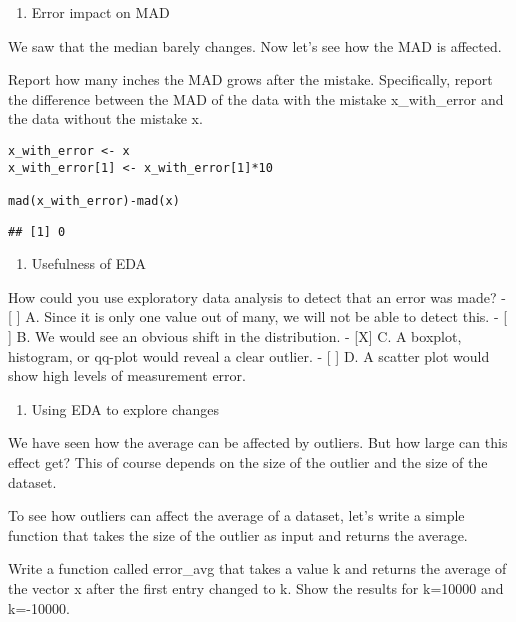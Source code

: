 \documentclass[]{article}
\providecommand{\tightlist}{%
  \setlength{\itemsep}{0pt}\setlength{\parskip}{0pt}}
\begin{document}
\begin{enumerate}
\def\labelenumi{\arabic{enumi}.}
\setcounter{enumi}{5}
\tightlist
\item
  Error impact on MAD
\end{enumerate}

We saw that the median barely changes. Now let's see how the MAD is
affected.

Report how many inches the MAD grows after the mistake. Specifically,
report the difference between the MAD of the data with the mistake
x\_with\_error and the data without the mistake x.

\begin{verbatim}
x_with_error <- x
x_with_error[1] <- x_with_error[1]*10

mad(x_with_error)-mad(x)
\end{verbatim}

\begin{verbatim}
## [1] 0
\end{verbatim}

\begin{enumerate}
\def\labelenumi{\arabic{enumi}.}
\setcounter{enumi}{6}
\tightlist
\item
  Usefulness of EDA
\end{enumerate}

How could you use exploratory data analysis to detect that an error was
made? - {[} {]} A. Since it is only one value out of many, we will not
be able to detect this. - {[} {]} B. We would see an obvious shift in
the distribution. - {[}X{]} C. A boxplot, histogram, or qq-plot would
reveal a clear outlier. - {[} {]} D. A scatter plot would show high
levels of measurement error.

\begin{enumerate}
\def\labelenumi{\arabic{enumi}.}
\setcounter{enumi}{7}
\tightlist
\item
  Using EDA to explore changes
\end{enumerate}

We have seen how the average can be affected by outliers. But how large
can this effect get? This of course depends on the size of the outlier
and the size of the dataset.

To see how outliers can affect the average of a dataset, let's write a
simple function that takes the size of the outlier as input and returns
the average.

Write a function called error\_avg that takes a value k and returns the
average of the vector x after the first entry changed to k. Show the
results for k=10000 and k=-10000.
\end{document}
